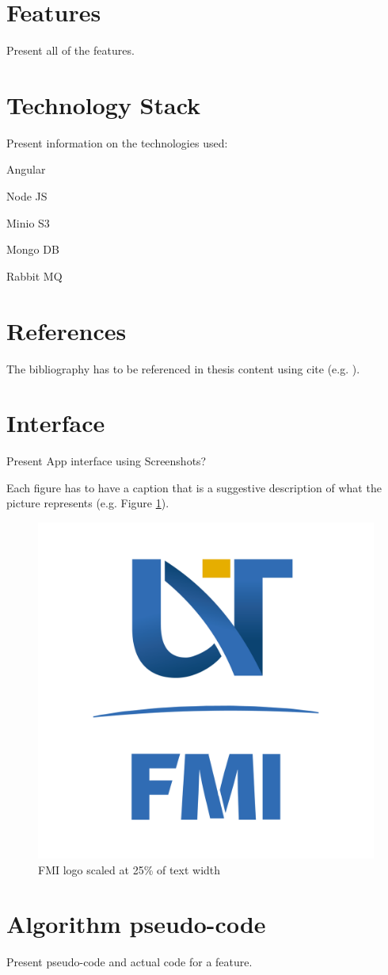 \newpage
\section{Features}
Present all of the features.

\section{Technology Stack}
Present information on the technologies used:
\begin{defn} Angular
\end{defn}
\begin{defn} Node JS
\end{defn}
\begin{defn} Minio S3
\end{defn}
\begin{defn} Mongo DB
\end{defn}
\begin{defn} Rabbit MQ
\end{defn}

\section{References}
The bibliography has to be referenced in thesis content using cite (e.g. \cite{Bersani}).

\section{Interface}
Present App interface using Screenshots?

Each figure has to have a caption that is a suggestive description of what  the  picture represents (e.g. Figure \ref{fig:siglaUVT}).
\begin{figure}[!ht]
    \centering
    \includegraphics[width=0.25\linewidth]{Ples Serban Thesis/FMI-03.png}
    \caption{ FMI logo scaled at 25\% of text width}
    \label{fig:siglaUVT}
\end{figure}

\section{Algorithm pseudo-code}
Present pseudo-code and actual code for a feature.

